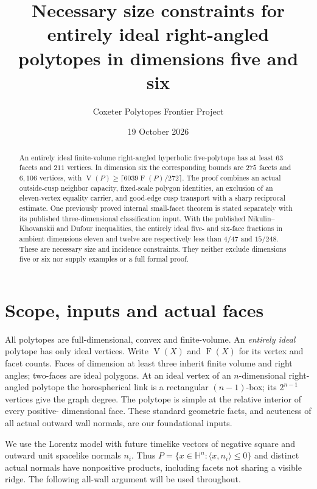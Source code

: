 \documentclass[11pt]{article}
\title{Necessary size constraints for entirely ideal\linebreak
right-angled polytopes in dimensions five and six}
\author{Coxeter Polytopes Frontier Project}
\date{19 October 2026}
\theoremstyle{remark}
\newcommand{\HH}{\mathbb H}
\newcommand{\VV}{\operatorname{V}}
\newcommand{\FF}{\operatorname{F}}
\newcommand{\ip}[2]{\langle #1,#2\rangle}
\begin{document}
\maketitle
\begin{abstract}
An entirely ideal finite-volume right-angled hyperbolic five-polytope
has at least $63$ facets and $211$ vertices. In dimension six the
corresponding bounds are $275$ facets and $6{,}106$ vertices, with
$\VV(P)\ge\lceil6039\FF(P)/272\rceil$.
The proof combines an actual outside-cusp neighbor capacity, fixed-scale
polygon identities, an exclusion of an eleven-vertex equality carrier,
and good-edge cusp transport with a sharp reciprocal estimate.
One previously proved internal small-facet theorem is stated separately
with its published three-dimensional classification input.
With the published Nikulin--Khovanskii and Dufour inequalities, the
entirely ideal five- and six-face fractions in ambient dimensions eleven
and twelve are respectively less than $4/47$ and $15/248$.
These are necessary size and incidence constraints. They neither exclude
dimensions five or six nor supply examples or a full formal proof.
\end{abstract}

\section{Scope, inputs and actual faces}\label{sec:foundations}

All polytopes are full-dimensional, convex and finite-volume. An
\emph{entirely ideal} polytope has only ideal vertices. Write $\VV(X)$
and $\FF(X)$ for its vertex and facet counts. Faces of dimension at least
three inherit finite volume and right angles; two-faces are ideal polygons.
At an ideal vertex of an
$n$-dimensional right-angled polytope the horospherical link is a
rectangular $(n-1)$-box; its $2^{n-1}$ vertices give the graph degree.
The polytope is simple at the relative interior of every positive-
dimensional face. These standard geometric facts, and acuteness of all
actual outward wall normals, are our foundational inputs.

We use the Lorentz model with future timelike vectors of negative square
and outward unit spacelike normals $n_i$. Thus
$P=\{x\in\HH^n:\ip{x}{n_i}\le0\}$ and distinct actual normals have
nonpositive products, including facets not sharing a visible ridge.
The following all-wall argument will be used throughout.
\end{document}
